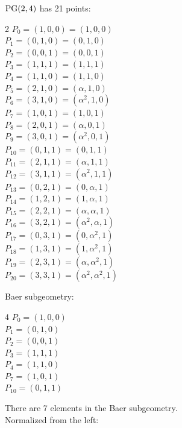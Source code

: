 ${\rm PG}(2, 4)$ has 21 points:\\
\begin{multicols}{2}
$P_{0}=( 1, 0, 0 )=(1, 0, 0)$\\
$P_{1}=( 0, 1, 0 )=(0, 1, 0)$\\
$P_{2}=( 0, 0, 1 )=(0, 0, 1)$\\
$P_{3}=( 1, 1, 1 )=(1, 1, 1)$\\
$P_{4}=( 1, 1, 0 )=(1, 1, 0)$\\
$P_{5}=( 2, 1, 0 )=(\alpha , 1, 0)$\\
$P_{6}=( 3, 1, 0 )=(\alpha^{2}, 1, 0)$\\
$P_{7}=( 1, 0, 1 )=(1, 0, 1)$\\
$P_{8}=( 2, 0, 1 )=(\alpha , 0, 1)$\\
$P_{9}=( 3, 0, 1 )=(\alpha^{2}, 0, 1)$\\
$P_{10}=( 0, 1, 1 )=(0, 1, 1)$\\
$P_{11}=( 2, 1, 1 )=(\alpha , 1, 1)$\\
$P_{12}=( 3, 1, 1 )=(\alpha^{2}, 1, 1)$\\
$P_{13}=( 0, 2, 1 )=(0, \alpha , 1)$\\
$P_{14}=( 1, 2, 1 )=(1, \alpha , 1)$\\
$P_{15}=( 2, 2, 1 )=(\alpha , \alpha , 1)$\\
$P_{16}=( 3, 2, 1 )=(\alpha^{2}, \alpha , 1)$\\
$P_{17}=( 0, 3, 1 )=(0, \alpha^{2}, 1)$\\
$P_{18}=( 1, 3, 1 )=(1, \alpha^{2}, 1)$\\
$P_{19}=( 2, 3, 1 )=(\alpha , \alpha^{2}, 1)$\\
$P_{20}=( 3, 3, 1 )=(\alpha^{2}, \alpha^{2}, 1)$\\
\end{multicols}
Baer subgeometry:\\
\begin{multicols}{4}
$P_{0}=( 1, 0, 0 )$\\
$P_{1}=( 0, 1, 0 )$\\
$P_{2}=( 0, 0, 1 )$\\
$P_{3}=( 1, 1, 1 )$\\
$P_{4}=( 1, 1, 0 )$\\
$P_{7}=( 1, 0, 1 )$\\
$P_{10}=( 0, 1, 1 )$\\
\end{multicols}
There are 7 elements in the Baer subgeometry.\\
Normalized from the left:\\
